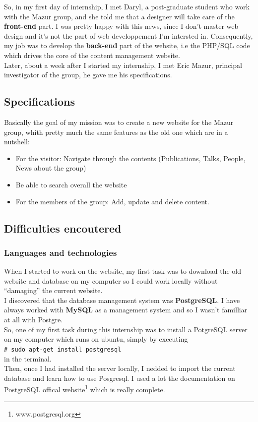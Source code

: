 \documentclass[10pt,a4paper]{article}
\newcommand{\shellcmd}[1]{\\\indent\indent\texttt{\footnotesize \# #1}\\}
\begin{document}
So, in my first day of internship, I met Daryl, a post-graduate student who work with the Mazur group, and she told me that a designer will take care of the \textbf{front-end } part. I was pretty happy with this news, since I don't master web design and it's not the part of web developpement I'm intersted in. Consequently, my job was to develop the \textbf{back-end} part of the website, i.e the PHP/SQL code which drives the core of the content management website. \\
Later, about a week after I started my internship, I met Eric Mazur, principal investigator of the group, he gave me his specifications.

\subsection{Specifications}
Basically the goal of my mission was to create a new website for the Mazur group, whith pretty much the same features as the old one which are in a nutshell:
\begin{itemize}
\item For the visitor: Navigate through the contents (Publications, Talks, People, News about the group)
\item Be able to search overall the website
\item For the members of the group: Add, update and delete content.
\end{itemize}

\subsection{Difficulties encoutered}

\subsubsection*{Languages and technologies}
When I started to work on the website, my first task was to download the old website and database on my computer so I could work locally without ``damaging'' the current website.\\

I discovered that the database management system was \textbf{PostgreSQL}. I have always worked with \textbf{MySQL} as a management system and so I wasn't familliar at all with Postgre.\\
So, one of my first task during this internship was to install a PotgreSQL server on my computer which runs on ubuntu, simply by executing \shellcmd{sudo apt-get install postgresql} in the terminal.\\
Then, once I had installed the server locally, I nedded to import the current database and learn how to use Posgresql. I used a lot the documentation on PostgreSQL offical website\footnote{www.postgresql.org} which is really complete.\\
\end{document}
